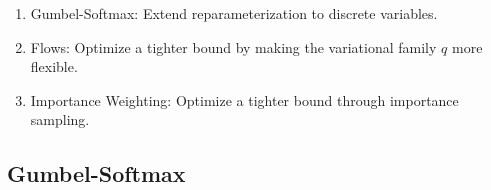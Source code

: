 

\begin{frame}
\begin{enumerate}
\item Gumbel-Softmax: Extend reparameterization to discrete variables.
\item Flows: Optimize a tighter bound by making the variational family $q$ more flexible.
\item Importance Weighting:  Optimize a tighter bound through importance sampling.
\end{enumerate}
\end{frame}



\subsection{Gumbel-Softmax}

